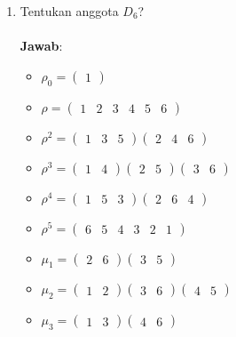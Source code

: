 \documentclass{article}
\begin{document}
\begin{enumerate}

    \item Tentukan anggota $D_6$?\\~\\
    \textbf{Jawab}:
        \begin{itemize}
            \item $\rho_0=\begin{pmatrix}1\end{pmatrix}$
            \item $\rho=\begin{pmatrix}1&2&3&4&5&6\end{pmatrix}$
            \item $\rho^2=\begin{pmatrix}1&3&5\end{pmatrix}\begin{pmatrix}2&4&6\end{pmatrix}$
            \item $\rho^3=\begin{pmatrix}1&4\end{pmatrix}\begin{pmatrix}2&5\end{pmatrix}\begin{pmatrix}3&6\end{pmatrix}$
            \item $\rho^4=\begin{pmatrix}1&5&3\end{pmatrix}\begin{pmatrix}2&6&4\end{pmatrix}$
            \item $\rho^5=\begin{pmatrix}6&5&4&3&2&1\end{pmatrix}$
            \item $\mu_1=\begin{pmatrix}2&6\end{pmatrix}\begin{pmatrix}3&5\end{pmatrix}$
            \item $\mu_2=\begin{pmatrix}1&2\end{pmatrix}\begin{pmatrix}3&6\end{pmatrix}\begin{pmatrix}4&5\end{pmatrix}$
            \item $\mu_3=\begin{pmatrix}1&3\end{pmatrix}\begin{pmatrix}4&6\end{pmatrix}$

\end{itemize}
\end{enumerate}
\end{document}
